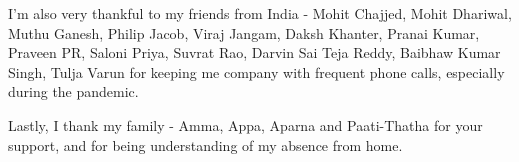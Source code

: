 \par
I'm also very thankful to my friends from India - Mohit Chajjed, Mohit Dhariwal, Muthu Ganesh, Philip Jacob, Viraj Jangam, Daksh Khanter, Pranai Kumar, Praveen PR, Saloni Priya, Suvrat Rao, Darvin Sai Teja Reddy, Baibhaw Kumar Singh, Tulja Varun for keeping me company with frequent phone calls, especially during the pandemic. 
\par
Lastly, I thank my family - Amma, Appa, Aparna and Paati-Thatha for your support, and for being understanding of my absence from home. 
\newpage
\thispagestyle{empty}